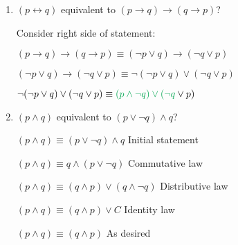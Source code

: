 \documentclass[a4paper,11pt]{article}
\begin{document}
\begin{enumerate}
  \item
  $(p \leftrightarrow q)$ equivalent to $(p \rightarrow q) \rightarrow (q \rightarrow p)$?

  Consider right side of statement:

  $(p \rightarrow q) \rightarrow (q \rightarrow p) \equiv (\neg p \vee q) \rightarrow (\neg q \vee p)$

  $(\neg p \vee q) \rightarrow (\neg q \vee p) \equiv \neg (\neg p \vee q) \vee (\neg q \vee p)$

  $\neg (\neg p \vee q) \vee (\neg q \vee p) \equiv {\color{Green} (p \wedge \neg q) \vee (\neg q } \vee p)$


  \item
  $(p \wedge q)$ equivalent to $(p \vee \neg q) \wedge q$?

  $(p \wedge q) \equiv (p \vee \neg q) \wedge q$
  \hfill
  {\color{Lavender} Initial statement}

  $(p \wedge q) \equiv q \wedge (p \vee \neg q)$
  \hfill
  {\color{Lavender} Commutative law}

  $(p \wedge q) \equiv (q \wedge p) \vee (q \wedge \neg q)$
  \hfill
  {\color{Lavender} Distributive law}

  $(p \wedge q) \equiv (q \wedge p) \vee C$
  \hfill
  {\color{Lavender} Identity law}

  $(p \wedge q) \equiv (q \wedge p)$
  \hfill
  {\color{Lavender} As desired}

\end{enumerate}
\end{document}
